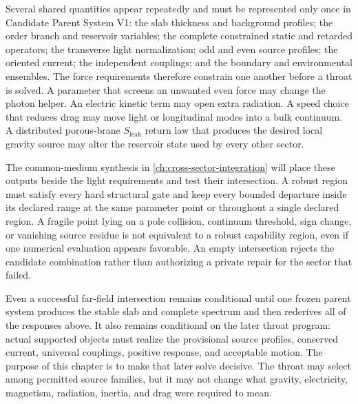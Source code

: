 Several shared quantities appear repeatedly and must be represented only once in
Candidate Parent System V1: the slab thickness and background profiles; the
order branch and reservoir variables; the complete constrained static and
retarded operators; the transverse light normalization; odd and even source
profiles; the oriented current; the independent couplings; and the boundary and
environmental ensembles. The force requirements therefore constrain one another
before a throat is solved. A parameter that screens an unwanted even force may
change the photon helper. An electric kinetic term may open extra radiation. A
speed choice that reduces drag may move light or longitudinal modes into a bulk
continuum. A distributed porous-brane \(S_{\mathrm{leak}}\) return law that
produces the desired local gravity source may alter the reservoir state used by
every other sector.

The common-medium synthesis in \cref{ch:cross-sector-integration} will place
these outputs beside the light requirements and test their intersection. A
robust region must satisfy every hard structural gate and keep every bounded
departure inside its declared range at the same parameter point or throughout a
single declared region. A fragile point lying on a pole collision, continuum
threshold, sign change, or vanishing source residue is not equivalent to a
robust capability region, even if one numerical evaluation appears favorable.
An empty intersection rejects the candidate combination rather than authorizing
a private repair for the sector that failed.

Even a successful far-field intersection remains conditional until one frozen
parent system produces the stable slab and complete spectrum and then rederives
all of the responses above. It also remains conditional on the later throat
program: actual supported objects must realize the provisional source profiles,
conserved current, universal couplings, positive response, and acceptable motion.
The purpose of this chapter is to make that later solve decisive. The throat may
select among permitted source families, but it may not change what gravity,
electricity, magnetism, radiation, inertia, and drag were required to mean.
